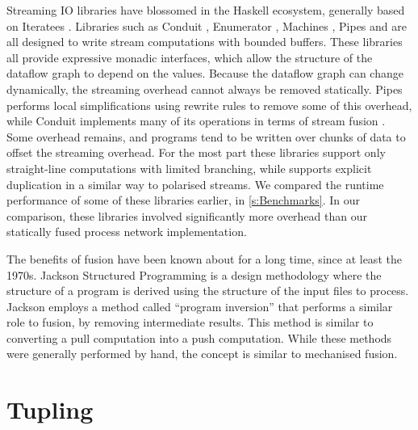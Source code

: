 
Streaming IO libraries have blossomed in the Haskell ecosystem, generally based on Iteratees \cite{kiselyov2012iteratees}.
Libraries such as Conduit \cite{hackage:conduit}, Enumerator \cite{hackage:enumerator}, Machines \cite{hackage:machines}, Pipes \cite{hackage:pipes} and \Streaming \cite{hackage:streaming} are all designed to write stream computations with bounded buffers.
These libraries all provide expressive monadic interfaces, which allow the structure of the dataflow graph to depend on the values.
Because the dataflow graph can change dynamically, the streaming overhead cannot always be removed statically.
Pipes performs local simplifications using rewrite rules to remove some of this overhead, while Conduit implements many of its operations in terms of stream fusion \citep{coutts2007stream}.
Some overhead remains, and programs tend to be written over chunks of data to offset the streaming overhead.
For the most part these libraries support only straight-line computations with limited branching, while \Streaming supports explicit duplication in a similar way to polarised streams.
We compared the runtime performance of some of these libraries earlier, in \cref{s:Benchmarks}.
In our comparison, these libraries involved significantly more overhead than our statically fused process network implementation.

The benefits of fusion have been known about for a long time, since at least the 1970s.
Jackson Structured Programming \citep{jackson1975principles,jackson2002jsp} is a design methodology where the structure of a program is derived using the structure of the input files to process.
Jackson employs a method called ``program inversion'' that performs a similar role to fusion, by removing intermediate results.
This method is similar to converting a pull computation into a push computation.
While these methods were generally performed by hand, the concept is similar to mechanised fusion.

\section{Tupling}
\label{related/tupling}

